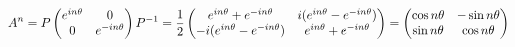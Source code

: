 \documentclass[preview]{standalone}
\begin{document}
\begin{align*}
\special{dvisvgm:raw <g id='unique000'>}A^n=P\begin{pmatrix}e^{in\theta}&0\\0&e^{-in\theta}\end{pmatrix}P^{-1}=\dfrac{1}{2}\begin{pmatrix}e^{in\theta}+e^{-in\theta}&i(e^{in\theta}-e^{-in\theta})\\-i(e^{in\theta}-e^{-in\theta})&e^{in\theta}+e^{-in\theta}\end{pmatrix}=\begin{pmatrix}\cos n\theta&-\sin n\theta\\\sin n\theta&\cos n\theta\end{pmatrix}\special{dvisvgm:raw </g>}
\end{align*}
\end{document}

